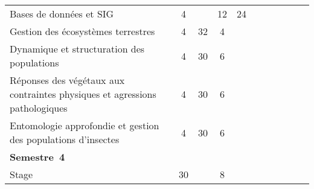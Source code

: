 \begin{tabular}{|m{5cm}|cm{0.75cm}|cm{0.75cm}|cm{0.75cm}|cm{0.75cm}|cm{0.75cm}|}
 \color{black} Bases de données et SIG & \color{black} 4 & \color{black} & \color{black} 12 & \color{black} 24 \\ \cline{1-5}

 \cellcolor{couleurClaire} \color{couleurTexte} Gestion des écosystèmes terrestres & \cellcolor{couleurClaire} \color{couleurTexte} 4 & \cellcolor{couleurClaire} \color{couleurTexte} 32 & \cellcolor{couleurClaire} \color{couleurTexte} 4 & \cellcolor{couleurClaire} \color{couleurTexte} \\ \cline{1-5}

 \color{black} Dynamique et structuration des populations & \color{black} 4 & \color{black} 30 & \color{black} 6 & \color{black}  \\ \cline{1-5}

 \cellcolor{couleurClaire} \color{couleurTexte} Réponses des végétaux aux contraintes physiques
et agressions pathologiques & \cellcolor{couleurClaire} \color{couleurTexte} 4 & \cellcolor{couleurClaire} \color{couleurTexte} 30 & \cellcolor{couleurClaire} \color{couleurTexte} 6 & \cellcolor{couleurClaire} \color{couleurTexte} \\ \cline{1-5}


 \color{black} Entomologie approfondie et gestion des populations d'insectes & \color{black} 4 & \color{black} 30 & \color{black} 6 & \color{black} \\ \cline{1-5}

\cline{1-5} 
\multicolumn{5}{l}{\color{black} \mbox{\textbf{Semestre 4}}}  \\ \cline{1-5}

 \cellcolor{couleurClaire} \color{couleurTexte} Stage & \cellcolor{couleurClaire} \color{couleurTexte} 30 & \cellcolor{couleurClaire} \color{couleurTexte} & \cellcolor{couleurClaire} \color{couleurTexte} 8 & \cellcolor{couleurClaire} \color{couleurTexte} \\ \cline{1-5}


\end{tabular}


